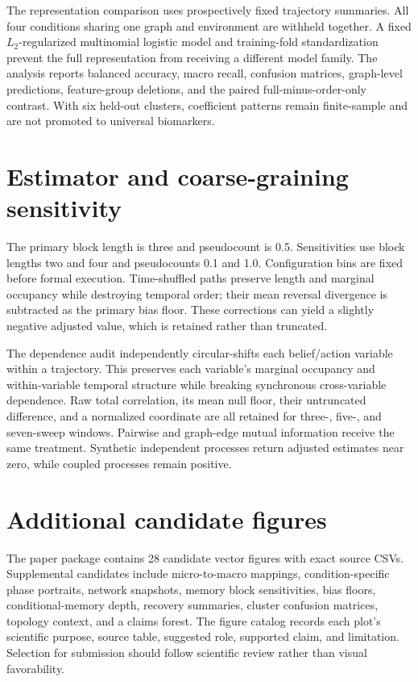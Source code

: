 \documentclass[12pt]{article}
\begin{document}
The representation comparison uses prospectively fixed trajectory summaries.
All four conditions sharing one graph and environment are withheld together.
A fixed $L_2$-regularized multinomial logistic model and training-fold
standardization prevent the full representation from receiving a different
model family. The analysis reports balanced accuracy, macro recall, confusion
matrices, graph-level predictions, feature-group deletions, and the paired
full-minus-order-only contrast. With six held-out clusters, coefficient
patterns remain finite-sample and are not promoted to universal biomarkers.

\section{Estimator and coarse-graining sensitivity}

The primary block length is three and pseudocount is 0.5. Sensitivities use
block lengths two and four and pseudocounts 0.1 and 1.0. Configuration bins are
fixed before formal execution. Time-shuffled paths preserve length and marginal
occupancy while destroying temporal order; their mean reversal divergence is
subtracted as the primary bias floor. These corrections can yield a slightly
negative adjusted value, which is retained rather than truncated.

The dependence audit independently circular-shifts each belief/action variable
within a trajectory. This preserves each variable's marginal occupancy and
within-variable temporal structure while breaking synchronous cross-variable
dependence. Raw total correlation, its mean null floor, their untruncated
difference, and a normalized coordinate are all retained for three-, five-, and
seven-sweep windows. Pairwise and graph-edge mutual information receive the
same treatment. Synthetic independent processes return adjusted estimates near
zero, while coupled processes remain positive.

\section{Additional candidate figures}

The paper package contains 28 candidate vector figures with exact source CSVs.
Supplemental candidates include micro-to-macro mappings, condition-specific
phase portraits, network snapshots, memory block sensitivities, bias floors,
conditional-memory depth, recovery summaries, cluster confusion matrices,
topology context, and a claims forest. The figure
catalog records each plot's scientific purpose, source table, suggested role,
supported claim, and limitation. Selection for submission should follow
scientific review rather than visual favorability.

\begingroup
\small


\endgroup
\end{document}

